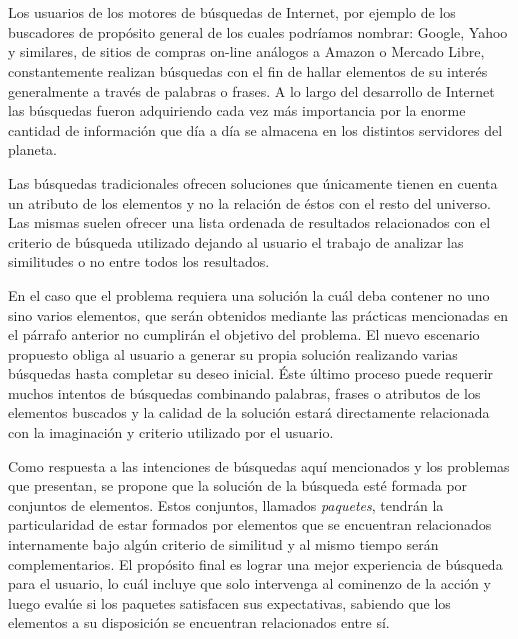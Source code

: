 \chapter*{\runtitulo}

\noindent 

Los usuarios de los motores de búsquedas de Internet, por ejemplo de los buscadores de propósito general de los cuales podríamos nombrar: Google, Yahoo y similares, de sitios de compras on-line análogos a Amazon o Mercado Libre, constantemente realizan búsquedas con el fin de hallar elementos de su interés generalmente a través de palabras o frases. A lo largo del desarrollo de Internet las búsquedas fueron adquiriendo cada vez más importancia por la enorme cantidad de información que día a día se almacena en los distintos servidores del planeta.

Las búsquedas tradicionales ofrecen soluciones que únicamente tienen en cuenta un atributo de los elementos y no la relación de éstos con el resto del universo. Las mismas suelen ofrecer una lista ordenada de resultados relacionados con el criterio de búsqueda utilizado dejando al usuario el trabajo de analizar las similitudes o no entre todos los resultados.

En el caso que el problema requiera una solución la cuál deba contener no uno sino varios elementos, que serán obtenidos mediante las prácticas mencionadas en el párrafo anterior no cumplirán el objetivo del problema. El nuevo escenario propuesto obliga al usuario a generar su propia solución realizando varias búsquedas hasta completar su deseo inicial. Éste último proceso puede requerir muchos intentos de búsquedas combinando palabras, frases o atributos de los elementos buscados y la calidad de la solución estará directamente relacionada con la imaginación y criterio utilizado por el usuario.

Como respuesta a las intenciones de búsquedas aquí mencionados y los problemas que presentan, se propone que la solución de la búsqueda esté formada por conjuntos de elementos. Estos conjuntos, llamados {\em paquetes}, tendrán la particularidad de estar formados por elementos que se encuentran relacionados internamente bajo algún criterio de similitud y al mismo tiempo serán complementarios. El propósito final es lograr una mejor experiencia de búsqueda para el usuario, lo cuál incluye que solo intervenga al cominenzo de la acción y luego evalúe si los paquetes satisfacen sus expectativas, sabiendo que los elementos a su disposición se encuentran relacionados entre sí.


